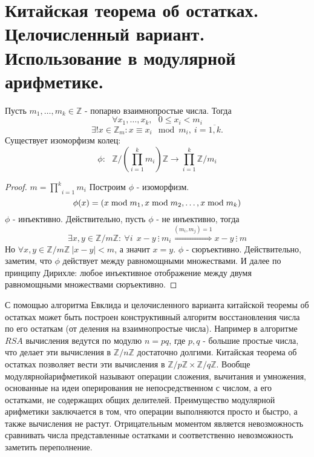 \section{Китайская теорема об остатках. Целочисленный вариант. Использование в модулярной арифметике.}

\begin{thm}
  Пусть $ m_1, \dots, m_k \in \mathbb{Z} $ - попарно взаимнопростые числа. Тогда
  \[\forall x_1, \dots, x_k, ~~~ 0 \le x_i < m_i  \]
  \[\exists ! x \in \mathbb{Z}_{m}: x \equiv x_i \mod m_i, ~i = \overline{1, k}.\]
Существует изоморфизм колец:
\[\phi:~~~\mathbb{Z}\bigg / ( {\underset{i = 1}{\overset{k}\prod} m_i} ) \mathbb{Z} \rightarrow \underset{i = 1}{\overset{k}\prod} \mathbb{Z}/m_i\]

\end{thm}
\begin{proof}
  $ m =  {\underset{i = 1}{\overset{k}\prod} m_i} $ \newline
  Построим $ \phi $ - изоморфизм.
  \[ \phi(x) = (x \; {\rm mod} \; m_1, x \; {\rm mod} \; m_2, \dots, x \; {\rm mod} \; m_k) \]
  $ \phi $ - инъективно. Действительно, пусть $ \phi $ - не инъективно, тогда
  \[ \exists x, y \in \mathbb{Z}/m\mathbb{Z} : ~ \forall i ~~ x - y ~ \vdots ~ m_i \overset{(m_{i}, m_{j}) = 1}{\Rightarrow} x - y ~ \vdots ~ m \]
  Но $ \forall x, y \in \mathbb{Z}/m\mathbb{Z} ~ |x - y| < m $, а значит $ x = y $. \newline
  $ \phi $ - сюръективно. Действительно, заметим, что $ \phi $ действует между равномощными множествами. И далее по принципу Дирихле: любое инъективное
  отображение между двумя равномощными множествами сюръективно.
\end{proof}

С помощью алгоритма Евклида и целочисленного варианта китайской теоремы об остатках может быть построен
конструктивный алгоритм восстановления числа по его остаткам (от деления на взаимнопростые числа). \newline
Например в алгоритме $ RSA $ вычисления ведутся по модулю $ n = pq $, где $ p, q $ - большие простые числа,
что делает эти вычисления в $ \mathbb{Z}/n\mathbb{Z} $ достаточно долгими. Китайская теорема об остатках 
позволяет вести эти вычисления в $ \mathbb{Z}/p\mathbb{Z} \times \mathbb{Z}/q\mathbb{Z} $. \newline
Вообще $ модулярной арифметикой $ называют операции сложения, вычитания и умножения, основанные на идеи
оперирования не непосредственном с числом, а его остатками, не содержащих общих делителей. Преимущество
модулярной арифметики заключается в том, что операции выполняются просто и быстро, а также вычисления не растут.
Отрицательным моментом является невозможность сравнивать числа представленные остатками и соответственно 
невозможность заметить переполнение.


